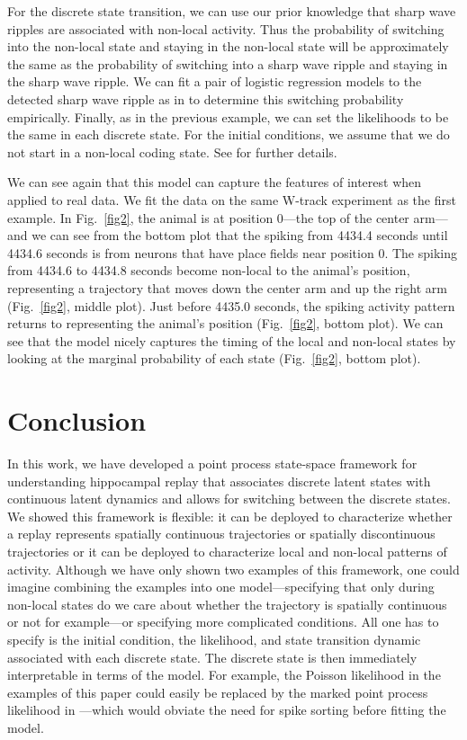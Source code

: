 \documentclass[conference]{IEEEtran}
\begin{document}
For the discrete state transition, we can use our prior knowledge that sharp wave ripples are associated with non-local activity. Thus the probability of switching into the non-local state and staying in the non-local state will be approximately the same as the probability of switching into a sharp wave ripple and staying in the sharp wave ripple. We can fit a pair of logistic regression models to the detected sharp wave ripple as in \cite{EdenCharacterizingComplexMultiScale2018} to determine this switching probability empirically.
Finally, as in the previous example, we can set the likelihoods to be the same in each discrete state. For the initial conditions, we assume that we do not start in a non-local coding state. See \cite{EdenCharacterizingComplexMultiScale2018} for further details.

We can see again that this model can capture the features of interest when applied to real data. We fit the data on the same W-track experiment as the first example. In  Fig.~\ref{fig2}, the animal is at position 0---the top of the center arm---and we can see from the bottom plot that the spiking from 4434.4 seconds until 4434.6 seconds is from neurons that have place fields near position 0. The spiking from 4434.6 to 4434.8 seconds become non-local to the animal's position, representing a trajectory that moves down the center arm and up the right arm (Fig.~\ref{fig2}, middle plot). Just before 4435.0 seconds, the spiking activity pattern returns to representing the animal's position (Fig.~\ref{fig2}, bottom plot). We can see that the model nicely captures the timing of the local and non-local states by looking at the marginal probability of each state (Fig.~\ref{fig2}, bottom plot).

\section{Conclusion}
In this work, we have developed a point process state-space framework for understanding hippocampal replay that associates discrete latent states with continuous latent dynamics and allows for switching between the discrete states. We showed this framework is flexible: it can be deployed to characterize whether a replay represents spatially continuous trajectories or spatially discontinuous trajectories or it can be deployed to characterize local and non-local patterns of activity. Although we have only shown two examples of this framework, one could imagine combining the examples into one model---specifying that only during non-local states do we care about whether the trajectory is spatially continuous or not for example---or specifying more complicated conditions. All one has to specify is the initial condition, the likelihood, and state transition dynamic associated with each discrete state. The discrete state is then immediately interpretable in terms of the model. For example, the Poisson likelihood in the examples of this paper could easily be replaced by the marked point process likelihood in \cite{DengRapidclassificationhippocampal2016}---which would obviate the need for spike sorting before fitting the model.
\end{document}
